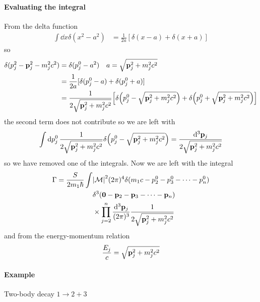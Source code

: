 \documentclass[../main.tex]{subfiles}
\begin{document}
\paragraph*{Evaluating the integral}
From the delta function
\begin{align*}
    \int \dd{x} \delta(x^2 - a^2) &= \frac{1}{2a} [\delta(x - a) + \delta(x + a)]
\end{align*}
so
\begin{align*}
    \delta(p_j^2 - \vb p_j^2 - m_j^2 c^2) &= \delta(p_j^0 - a^2) \quad a = \sqrt{\vb p_j^2 + m_j^2 c^2} \\
    &= \frac{1}{2a} [\delta(p_j^0 - a) + \delta(p_j^0 + a)] \\
    &= \frac{1}{2\sqrt{\vb p_j^2 + m_j^2 c^2}} \qt[\delta \qt(p_j^0 - \sqrt{\vb p_j^2 + m_j^2 c^2}) 
        + \delta \qt(p_j^0 + \sqrt{\vb p_j^2 + m_j^2 c^2})]
\end{align*}
the second term does not contribute so we are left with
\begin{align*}
    \int \dd{p_j^0} \frac{1}{2\sqrt{\vb p_j^2 + m_j^2 c^2}} \delta \qt(p_j^0 - \sqrt{\vb p_j^2 + m_j^2 c^2}) 
    = \frac{\dd^3 \vb p_j}{2\sqrt{\vb p_j^2 + m_j^2 c^2}}
\end{align*}
so we have removed one of the integrals. Now we are left with the integral
\begin{align*}
    \Gamma = \frac{S}{2m_1 \hbar} \int &\abs{\mathcal{M}}^2 (2\pi)^4 
        \delta(m_1  c - p_2^0 - p_3^0 - \dots - p_n^0) \\
        &\delta^3 (\vb 0 - \vb p_2 - \vb p_3 - \dots - \vb p_n) \\
        & \times \prod_{j=2}^n \frac{\dd^3 \vb p_j}{(2\pi)^3} \frac{1}{2\sqrt{\vb p_j^2 + m_j^2 c^2}}
\end{align*}
and from the energy-momentum relation
\begin{align*}
    \frac{E_j}{c} = \sqrt{\vb p_j^2 + m_j^2 c^2}
\end{align*}

\paragraph*{Example} Two-body decay $1 \to 2 + 3$
\end{document}
